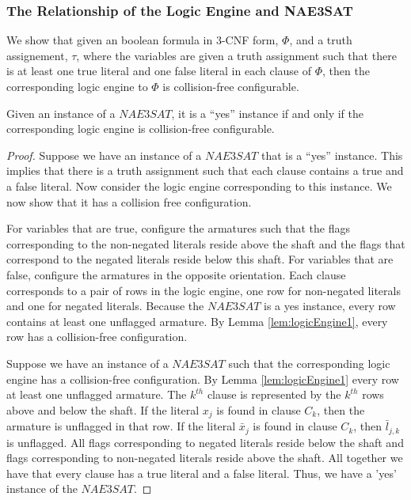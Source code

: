 \subsubsection{The Relationship of the Logic Engine and NAE3SAT}

We show that given an boolean formula in 3-CNF form, $\Phi$, and a truth assignement, $\tau$, where the variables are given a truth assignment such that there is at least one true literal and one false literal in each clause of $\Phi$, then the corresponding logic engine to $\Phi$ is collision-free configurable.
\begin{thm}\label{thm:LogicEngineV3-1}
 Given an instance of a $NAE3SAT$,  it is a ``yes'' instance if and only if the corresponding logic 
engine is collision-free configurable.
\end{thm}
\begin{proof}
Suppose we have an instance of a $NAE3SAT$ that is a ``yes'' instance. This implies that there is a 
truth assignment such that each clause contains a true and a false literal. Now consider the logic 
engine corresponding to this instance. We now 
show that it has a collision free configuration.

For variables that are true, configure the armatures such that the flags corresponding to the 
non-negated literals reside above the 
shaft and the flags that correspond to the negated literals reside below this shaft.  For variables 
that are false, configure the 
armatures in the opposite orientation.  Each clause corresponds to a pair of rows in 
the logic engine, one row for non-negated literals and one for negated literals.  Because the 
$NAE3SAT$ is a yes instance, every row contains at least one unflagged armature.  
By Lemma \ref{lem:logicEngine1}, every row  has a collision-free configuration.

Suppose we have an instance of a $NAE3SAT$ such that the corresponding logic engine has a 
collision-free configuration. By Lemma \ref{lem:logicEngine1} every row at least one unflagged 
armature.  The $k^{th}$ clause is represented by the $k^{th}$ rows above and below the shaft. If the 
literal $x_j$ is found in clause $C_k$, then the armature is unflagged in that row. If the literal 
$\bar{x}_j$ is found in clause $C_k$, then $\bar{l}_{j,k}$ is unflagged.  All flags 
corresponding to negated literals reside below the shaft and flags corresponding to non-negated 
literals reside above the shaft.  All together we have that every clause has a true literal and a 
false literal.  Thus, we have a 'yes' instance of the $NAE3SAT$.
\end{proof}
